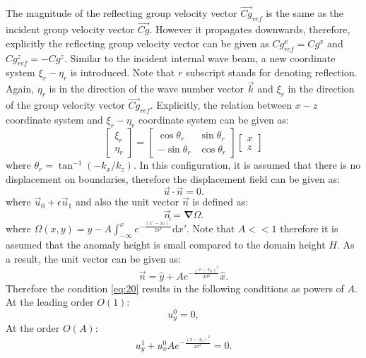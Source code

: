 \documentclass[12pt]{report}
\begin{document}
The magnitude of the reflecting group velocity vector $\vec{Cg}_{ref}$ is the same as the incident group velocity vector $\vec{Cg}$. However it propagates downwards, therefore, explicitly the reflecting group velocity vector can be given as $Cg_{ref}^x=Cg^x$ and $Cg_{ref}^z=-Cg^z$. Similar to the incident internal wave beam, a new coordinate system $\xi_r-\eta_r$ is introduced. Note that $r$ subscript stands for denoting reflection. Again, $\eta_r$ is in the direction of the wave number vector $\vec{k}$ and $\xi_r$ in the direction of the group velocity vector $\vec{Cg}_{ref}$. Explicitly, the relation between $x-z$ coordinate system and $\xi_r-\eta_r$ coordinate system can be given as:
\begin{equation}
\begin{bmatrix}
\xi_r\\ 
\eta_r
\end{bmatrix}
=
\begin{bmatrix}
\cos \theta_r & \sin \theta_r \\ 
 -\sin \theta_r & \cos \theta_r 
\end{bmatrix}
\begin{bmatrix}
x\\
z 
\end{bmatrix}
\end{equation}
where $\theta_r=\tan^{-1}(-k_x/k_z)$.
In this configuration, it is assumed that there is no displacement on boundaries, therefore the displacement field can be given as:
\begin{equation}
\label{eq:20}
\vec{u}\cdot \vec{n}=0.
\end{equation}
where $\vec{u}_0 + \epsilon \vec{u}_1$ and also the unit vector $\vec{n}$ is defined as:
\begin{equation}
\vec{n}=\mathbf{\nabla}\Omega.
\end{equation}
where $\Omega(x,y)=y-A\int_{-\infty}^x e^{-\frac{(x'-x_0)^2}{2\sigma^2}}\mathrm{d}x'$. Note that $A<<1$ therefore it is assumed that the anomaly height is small compared to the domain height $H$. As a result, the unit vector can be given as:
\begin{equation}
\vec{n}=\hat{y}+A e^{-\frac{(x-x_0)^2}{2\sigma^2}}\hat{x}.
\end{equation}
Therefore the condition \ref{eq:20} results in the following conditions as powers of $A$. At the leading order $O(1)$:
\begin{equation}
u_{y}^{0}=0,
\end{equation}
At the order $O(A)$:
\begin{equation}
u_{y}^{1}+u_{x}^{0}A e^{-\frac{(x-x_0)^2}{2\sigma^2}}=0.
\end{equation}
\end{document}
